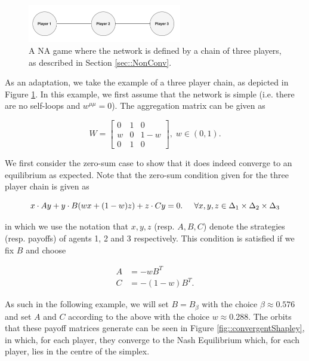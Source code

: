 \documentclass{article}
\theoremstyle{definition}
\begin{document}
  \begin{figure}[t]
    \centering
    \includegraphics[width = 0.6\textwidth]{Figures/ThreePlayerNetwork.png}
    \caption{\label{fig::ThreePlayerNetwork} A NA game where the network is defined by a chain of
    three players, as described in Section \ref{sec::NonConv}.}
  \end{figure}

  As an adaptation, we take the example of a three player chain, as depicted in Figure \ref{fig::ThreePlayerNetwork}. In this example, we first assume that the network is simple (i.e. there are no self-loops and $w^{\mu \mu} = 0$). The aggregation matrix can be given as

  \begin{equation}
    W = \begin{bmatrix}
      0 & 1 & 0 \\
      w & 0 & 1 - w \\
      0 & 1 & 0
    \end{bmatrix}, \; w \in (0, 1).
  \end{equation}


  We first consider the zero-sum case to show that it does indeed converge to an equilibrium as expected. Note that the zero-sum condition given for the three player chain is given as

  \begin{equation}
    x \cdot A y + y \cdot B (w x + (1-w)z) + z \cdot C y = 0. \hspace{0.5cm} \forall x, y, z \in \Delta_1 \times \Delta_2 \times \Delta_3
  \end{equation}

  in which we use the notation that $x, y, z$ (resp. $A, B, C$) denote the strategies (resp. payoffs) of agents 1, 2 and 3 respectively. This condition is satisfied if we fix $B$ and choose

  \begin{align} \label{eq::zeroSumShapley}
    A & = - w B^T \nonumber \\
    C & = - (1 - w) B^T. 
  \end{align}

  As such in the following example, we will set $B = B_\beta$ with the choice $\beta \approx 0.576$ and set $A$ and $C$ according to the above with the choice $w \approx 0.288$. The orbits that these payoff matrices generate can be seen in Figure \ref{fig::convergentShapley}, in which, for each player, they converge to the Nash Equilibrium which, for each player, lies in the centre of the simplex.
\end{document}
